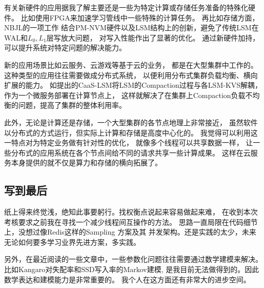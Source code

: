 有关新硬件的应用据我了解主要还是一些为特定计算或存储任务准备的特殊化硬件。
比如使用FPGA来加速学习管线中一些特殊的计算任务\cite{nurvi_2020_fpga}。
再比如存储方面，NBJL的一项工作
结合PM-NVM硬件以及LSM结构上的创新，避免了传统LSM在WAL和$L_0, L_1$层写放大问题，
对写入性能作出了显著的优化\cite{he_flatlsm_2023}。
通过新硬件加持，可以提升系统对特定问题的解决能力。

新的应用场景比如云服务、云游戏等基于云的业务，
都是在大型集群中工作的。这种类型的应用往往需要做成分布式系统，
以便利用分布式集群负载均衡、横向扩展的能力。
如\cite{qiaolin_yu_caas-lsm_2024}提出的CaaS-LSM将LSM的Compaction过程与各LSM-KVS解耦，
作为一个微服务部署在计算节点上，
这样就解决了在集群上Compaction负载不均衡的问题，提高了集群的整体利用率。

此外，无论是计算还是存储，一个大型集群的各节点地理上非常接近，
虽然软件以分布式的方式运行，但实际上计算和存储是高度中心化的。
我觉得可以利用这一特点对为特定业务做有针对性的优化，
就像多个线程可以共享数据一样，
让一些分布式的应用系统在各个节点间给不同的请求共享一些计算成果。
这样在云服务本身提供的就不仅是算力和存储的横向拓展了。

\subsection{写到最后}

纸上得来终觉浅，绝知此事要躬行。找权衡点说起来容易做起来难，
在收到本次考核要求之前我在寻找一个减少线程间互操作的方法。
思路一直局限在代码细节上，没想过像Redis这样的Sampling 方案及其
并发架构。还是实践的太少，未来无论如何要多学习业界先进方案，多实践。

另外，在最近阅读的一些文章中，一些参数化问题往往需要通过数学建模来解决。
比如Kangaro对失配率和SSD写入率的Markov建模\cite{mcallister_kangaroo_2021},
是我目前无法做得到的。因此数学表达和建模能力是非常重要的。
我个人在这方面还有非常大的进步空间。
